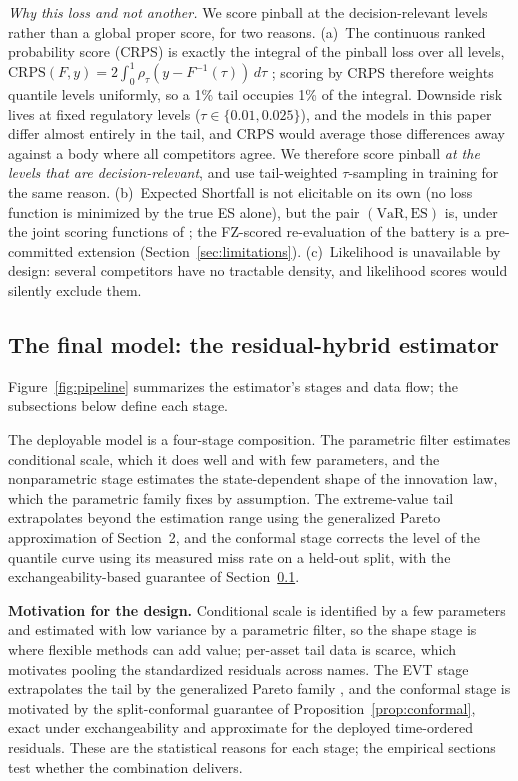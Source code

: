 \documentclass[11pt]{article}
\newcommand{\VaR}{\mathrm{VaR}}
\newcommand{\ES}{\mathrm{ES}}
\theoremstyle{remark}
\begin{document}
\emph{Why this loss and not another.} We score pinball at the
decision-relevant levels rather than a global proper score, for two
reasons. (a)~The continuous ranked probability
score (CRPS) is exactly the integral of the pinball loss over all
levels, $\mathrm{CRPS}(F,y) = 2\int_0^1 \rho_\tau(y - F^{-1}(\tau))\,
d\tau$ \citep{gneitingraftery2007}; scoring by CRPS therefore weights
quantile levels uniformly, so a 1\% tail occupies 1\% of the
integral. Downside
risk lives at fixed regulatory levels ($\tau \in \{0.01, 0.025\}$), and
the models in this paper differ almost entirely in the tail, and CRPS
would average those differences away against a body where all
competitors agree. We therefore score pinball \emph{at the levels that
are decision-relevant}, and use tail-weighted $\tau$-sampling in
training for the same reason. (b)~Expected Shortfall is not elicitable
on its own (no loss function is minimized by the true ES alone), but
the pair $(\VaR,\ES)$ is, under the joint scoring functions of
\citet{fissler2016}; the FZ-scored re-evaluation of the battery is a
pre-committed extension (Section~\ref{sec:limitations}). (c)~Likelihood is
unavailable by design: several competitors have no tractable density, and likelihood scores
would silently exclude them.

\subsection{The final model: the residual-hybrid estimator}\label{sec:hybrid}

Figure~\ref{fig:pipeline} summarizes the estimator's stages and data
flow; the subsections below define each stage.

The deployable model is a four-stage composition. The parametric
filter estimates conditional scale, which it does well and with few
parameters, and the nonparametric stage estimates the state-dependent
shape of the innovation law, which the parametric family fixes by
assumption. The extreme-value tail extrapolates beyond the estimation
range using the generalized Pareto approximation of Section~2, and the
conformal stage corrects the level of the quantile curve using its
measured miss rate on a held-out split, with the exchangeability-based
guarantee of Section~\ref{sec:hybrid}.

\noindent\textbf{Motivation for the design.} Conditional scale is
identified by a few parameters and estimated with low variance by a
parametric filter, so the shape stage is where flexible methods can
add value; per-asset tail data is scarce, which motivates pooling the
standardized residuals across names. The EVT stage extrapolates the
tail by the generalized Pareto family \citep{balkema1974,
pickands1975}, and the conformal stage is motivated by the
split-conformal guarantee of Proposition~\ref{prop:conformal}, exact
under exchangeability and approximate for the deployed time-ordered
residuals. These are the
statistical reasons for each stage; the empirical sections test
whether the combination delivers.
\end{document}
